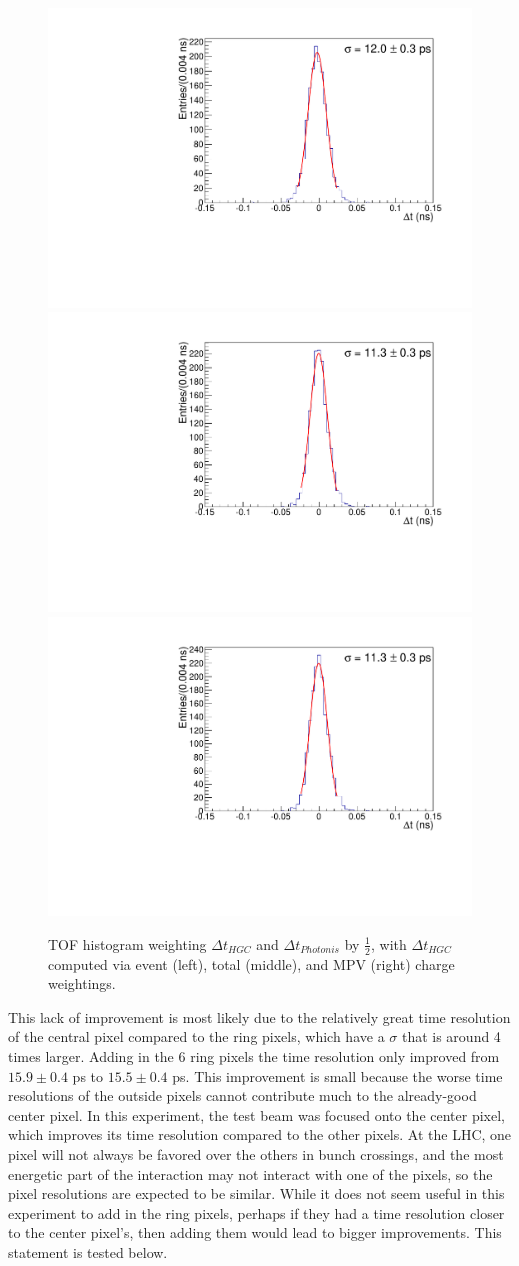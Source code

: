 \documentclass[twocolumn,aps,prd,reprint,superscriptaddress,floatfix]{revtex4-1}
\begin{document}
\begin{figure}[!htbp]
	\centering
	\includegraphics[width=.32\textwidth]{deltaT_PicoSilEventCharge_MCP_Equal104.pdf}
	\includegraphics[width=.32\textwidth]{deltaT_PicoSilTotalCharge_MCP_Equal104.pdf}
	\includegraphics[width=.32\textwidth]{deltaT_PicoSilLandauCharge_MCP_Equal104.pdf}
	\caption{TOF histogram weighting $\Delta t_{HGC}$ and $\Delta t_{Photonis}$ by $\frac{1}{2}$, with $\Delta t_{HGC}$ computed via event (left), total (middle), and MPV (right) charge weightings.}
	\label{fig:HGCMCP_event_total_MPV_104}
\end{figure}

This lack of improvement is most likely due to the relatively great time resolution of the central pixel compared to the ring pixels, which have a $\sigma$ that is around 4 times larger. 
Adding in the 6 ring pixels the time resolution only improved from $15.9 \pm 0.4$ ps to $15.5 \pm 0.4$ ps.
This improvement is small because the worse time resolutions of the outside pixels cannot contribute much to the already-good center pixel.
In this experiment, the test beam was focused onto the center pixel, which improves its time resolution compared to the other pixels. 
At the LHC, one pixel will not always be favored over the others in bunch crossings, and the most energetic part of the interaction may not interact with one of the pixels, so the pixel resolutions are expected to be similar.
While it does not seem useful in this experiment to add in the ring pixels, perhaps if they had a time resolution closer to the center pixel's, then adding them would lead to bigger improvements.
This statement is tested below.
\end{document}
